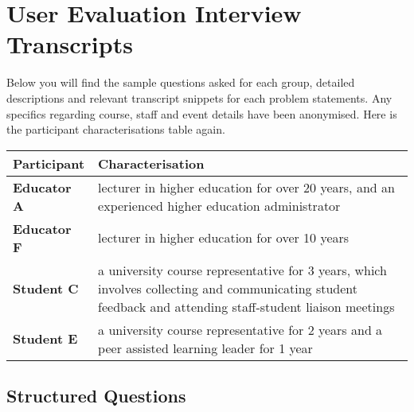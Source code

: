 
\chapter{User Evaluation Interview Transcripts}

Below you will find the sample questions asked for each group, detailed descriptions and relevant transcript 
snippets for each problem statements. 
Any specifics regarding course, staff and event details have been anonymised.
Here is the participant characterisations table again.

\begin{table}[!h] 
    \centering
    \begin{tabularx}{\textwidth}{>{\bfseries}lX}
        Participant & Characterisation\\
        \toprule
        Educator A & lecturer in higher education for over 20 years, and an experienced higher education 
        administrator\\\midrule
        Educator F & lecturer in higher education for over 10 years\\\midrule
        Student C & a university course representative for 3 years, which involves collecting and 
        communicating student feedback and attending staff-student liaison meetings \\\midrule
        Student E & a university course representative for 2 years and a peer assisted learning leader 
        for 1 year\\\bottomrule
    \end{tabularx}
\end{table}

\section{Structured Questions}

